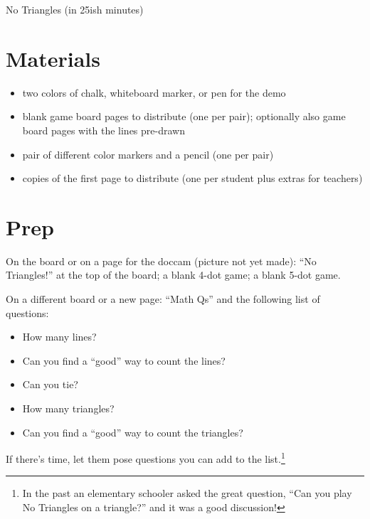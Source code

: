 \documentclass{article}
\begin{document}
    \begin{Huge}
        No Triangles (in 25ish minutes)
    \end{Huge}

    \hrulefill 

    \section{Materials}
        \begin{itemize}
            \item two colors of chalk, whiteboard marker, or pen for the demo
            \item blank game board pages to distribute (one per pair); optionally also game board pages with the lines pre-drawn
            \item pair of different color markers and a pencil (one per pair)
            \item copies of the first page to distribute (one per student plus extras for teachers)
        \end{itemize}

    \section{Prep}

    On the board or on a page for the doccam (picture not yet made): ``No Triangles!'' at the top of the board; a blank 4-dot game; a blank 5-dot game.
    
    On a different board or a new page: ``Math Qs'' and the following list of questions:
    \begin{itemize}
        \item How many lines?
        \item Can you find a ``good'' way to count the lines?
        \item Can you tie?
        \item How many triangles?
        \item Can you find a ``good'' way to count the triangles?
    \end{itemize}
    
    If there's time, let them pose questions you can add to the list.\footnote{In the past an elementary schooler asked the great question, ``Can you play No Triangles on a triangle?'' and it was a good discussion!}
     
\end{document}

